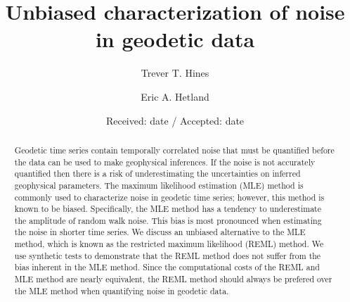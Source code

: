 \documentclass{svjour3}                     %
\begin{document}
\title{Unbiased characterization of noise in geodetic data}
\author{Trever T. Hines \and Eric A. Hetland}


\date{Received: date / Accepted: date}

\maketitle

\begin{abstract}
Geodetic time series contain temporally correlated noise that must be quantified before the data can be used to make geophysical inferences. If the noise is not accurately quantified then there is a risk of underestimating the uncertainties on inferred geophysical parameters. The maximum likelihood estimation (MLE) method is commonly used to characterize noise in geodetic time series; however, this method is known to be biased. Specifically, the MLE method has a tendency to underestimate the amplitude of random walk noise. This bias is most pronounced when estimating the noise in shorter time series. We discuss an unbiased alternative to the MLE method, which is known as the restricted maximum likelihood (REML) method. We use synthetic tests to demonstrate that the REML method does not suffer from the bias inherent in the MLE method. Since the computational costs of the REML and MLE method are nearly equivalent, the REML method should always be prefered over the MLE method when quantifying noise in geodetic data. 

\end{abstract}
\end{document}
